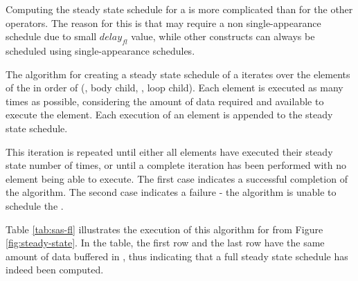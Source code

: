 \begin{comment}
\begin{displaymath}
\begin{array}{rl}
in^i_B = & l_j * u_j - l_B * o_{fl_B} \\
out^i_B = & u^i_{fl_B} + l_B * u_{fl_B} - l_s * o_s\\
in^i_L = & l_s * w_{s, 1} - l_L * o_{fl_L} \\
out^i_L = & delay_{fl} + u^i_{fl_L} + l_L * u_{fl_L} - l_j * w_{j,1} \\
\end{array}
\end{displaymath}
\end{comment}

 Computing the steady
state schedule for a {\feedbackloop} is more complicated than for
the other operators.  The reason for this is that {\feedbackloops}
may require a non single-appearance schedule due to small
$delay_{fl}$ value, while other {\StreamIt} constructs can always
be scheduled using single-appearance schedules.

\begin{comment}
The algorithm used for creating of a steady state schedule
will work in several phases.  The amount of data present in
{\Channels} between the children of the {\feedbackloop}, the
{\joiner} and the {\splitter} is kept track of to determine which
element is allowed to execute.
\end{comment}

The algorithm for creating a steady state schedule of a
{\feedbackloop} iterates over the elements of the {\feedbackloop}
in order of ({\joiner}, body child, {\splitter}, loop child). Each
element is executed as many times as possible, considering the
amount of data required and available to execute the element. Each
execution of an element is appended to the steady state schedule.

This iteration is repeated until either all elements have executed
their steady state number of times, or until a complete iteration
has been performed with no element being able to execute. The
first case indicates a successful completion of the algorithm. The
second case indicates a failure - the algorithm is unable to
schedule the {\feedbackloop}.

Table \ref{tab:sas-fl} illustrates the execution of this algorithm
for {\feedbackloop} from Figure \ref{fig:steady-state}. In the
table, the first row and the last row have the same amount of data
buffered in {\Channels}, thus indicating that a full steady
state schedule has indeed been computed.

